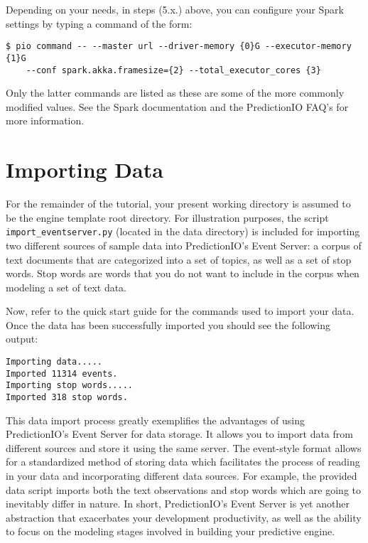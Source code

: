 \documentclass[a4paper,12pt]{article}
\renewcommand{\tt}[1]{\texttt{#1}}
\newcommand{\3}{\left}
\newcommand{\4}{\right}
\renewcommand{\-}[1]{{}^{-#1}}
\begin{document}
Depending on your needs, in steps (5.x.) above, you can configure your Spark settings by typing a command of the form:
\begin{verbatim}
$ pio command -- --master url --driver-memory {0}G --executor-memory {1}G 
	--conf spark.akka.framesize={2} --total_executor_cores {3}
\end{verbatim}
Only the latter commands are listed as these are some of the more commonly modified values. See the Spark documentation
and the PredictionIO FAQ's 
for more information.


\section*{Importing Data}

For the remainder of the tutorial, your present working directory is assumed to be the engine template root directory. For illustration purposes, the script \tt{import\_eventserver.py} (located in the data directory) is included for importing two different sources of sample data into PredictionIO's Event Server: a corpus of text documents
that are categorized into a set of topics, as well as a set of stop words. Stop words are words that you do not want to include in the corpus when modeling a set of text data. 

Now, refer to the quick start guide for the commands used to import your data. Once the data has been successfully imported you should see the following output:
\vspace{-0.5cm}
\begin{verbatim}
Importing data.....
Imported 11314 events.
Importing stop words.....
Imported 318 stop words.
 \end{verbatim}
 This data import process greatly exemplifies the advantages of using PredictionIO's Event Server for data storage. It allows you to import data from different sources and store it using the same server. The event-style format
 allows for a standardized method of storing data which facilitates the process of reading in your data and incorporating different data sources. For example, the provided data script imports both the text observations and stop words which are going to inevitably differ in nature. In short, PredictionIO's Event Server is yet another abstraction that exacerbates your development productivity, as well as the ability to focus on the modeling stages involved in building your predictive engine.
 
\end{document}
